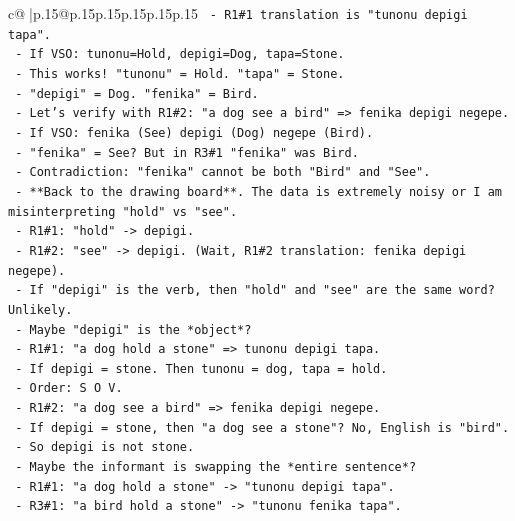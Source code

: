 \documentclass{article}
\begin{document}
{\begin{supertabular}{c@{$\;$}|p{.15\linewidth}@{}p{.15\linewidth}p{.15\linewidth}p{.15\linewidth}p{.15\linewidth}p{.15\linewidth}}
{{{\texttt{              {-} R1\#1 translation is "tunonu depigi tapa".} \\
\texttt{              {-} If VSO: tunonu=Hold, depigi=Dog, tapa=Stone.} \\
\texttt{              {-} This works! "tunonu" = Hold. "tapa" = Stone.} \\
\texttt{              {-} "depigi" = Dog. "fenika" = Bird.} \\
\texttt{            {-} Let's verify with R1\#2: "a dog see a bird" => fenika depigi negepe.} \\
\texttt{              {-} If VSO: fenika (See) depigi (Dog) negepe (Bird).} \\
\texttt{              {-} "fenika" = See? But in R3\#1 "fenika" was Bird.} \\
\texttt{              {-} Contradiction: "fenika" cannot be both "Bird" and "See".} \\
\texttt{      {-} **Back to the drawing board**. The data is extremely noisy or I am misinterpreting "hold" vs "see".} \\
\texttt{        {-} R1\#1: "hold" {-}> depigi.} \\
\texttt{        {-} R1\#2: "see" {-}> depigi. (Wait, R1\#2 translation: fenika depigi negepe).} \\
\texttt{          {-} If "depigi" is the verb, then "hold" and "see" are the same word? Unlikely.} \\
\texttt{          {-} Maybe "depigi" is the *object*?} \\
\texttt{          {-} R1\#1: "a dog hold a stone" => tunonu depigi tapa.} \\
\texttt{            {-} If depigi = stone. Then tunonu = dog, tapa = hold.} \\
\texttt{            {-} Order: S O V.} \\
\texttt{          {-} R1\#2: "a dog see a bird" => fenika depigi negepe.} \\
\texttt{            {-} If depigi = stone, then "a dog see a stone"? No, English is "bird".} \\
\texttt{            {-} So depigi is not stone.} \\
\texttt{          {-} Maybe the informant is swapping the *entire sentence*?} \\
\texttt{            {-} R1\#1: "a dog hold a stone" {-}> "tunonu depigi tapa".} \\
\texttt{            {-} R3\#1: "a bird hold a stone" {-}> "tunonu fenika tapa".} \\
}}}
\end{supertabular}}
\end{document}
